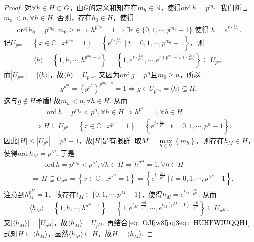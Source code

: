 \documentclass[../../main.tex]{subfiles}%
\begin{document}
\begin{proof}
对$\forall h\in H\subset G$，由$G$的定义和知存在$m_h\in\mathbb{N}$，使得$\mathrm{ord}\,h=p^{m_h}$. 我们断言$m_h<n,\forall h\in H$. 否则，存在$h_0\in H$，使得
\begin{align*}
\mathrm{ord}\,h_0=p^{m_0},m_0\geqslant n\Longrightarrow h^{p^{m_0}}=1\Longrightarrow \exists r\in \{0,1,\cdots,p^{m_0}-1\} \text{ 使得 } h=e^{r\cdot \frac{2\pi \mathrm{i}}{p^{m_0}}}.
\end{align*}
记$U_{p^{m_0}}=\left\{ x\in\mathbb{C} \mid x^{p^{m_0}}=1 \right\} =\left\{ e^{t\cdot \frac{2\pi \mathrm{i}}{p^{m_0}}}\mid t=0,1,\cdots,p^{m_0}-1 \right\}$，则
\begin{align*}
\langle h \rangle =\left\{ 1,h,\cdots,h^{p^{m_0}-1} \right\} =\left\{ 1,e^{r\cdot \frac{2\pi \mathrm{i}}{p^{m_0}}},\cdots,e^{r(p^{m_0}-1)\cdot \frac{2\pi \mathrm{i}}{p^{m_0}}} \right\} \subseteq U_{p^{m_0}}.
\end{align*}
而$| U_{p^{m_0}} |=| \langle h \rangle |$，故$\langle h \rangle =U_{p^{m_0}}$. 又因为$\mathrm{ord}\,g=p^n$且$m_0\geqslant n$，所以
\begin{align*}
g^{p^m}=(g^{p^n})^{p^{m_0-n}}=1\Longrightarrow g\in U_{p^{m_0}}=\langle h \rangle \subseteq H,
\end{align*}
这与$g\notin H$矛盾! 故$m_h<n,\forall h\in H$. 从而
\begin{align*}
&\quad\quad \mathrm{ord}\,h=p^{m_h}<p^n,\forall h\in H\Longrightarrow h^{p^n}=1,\forall h\in H
\\
&\Longrightarrow H\subseteq U_{p^n}=\left\{ x\in\mathbb{C} \mid x^{p^n}=1 \right\} =\left\{ e^{t\cdot \frac{2\pi \mathrm{i}}{p^n}}\mid t=0,1,\cdots,p^n-1 \right\}.
\end{align*}
因此$| H |\leqslant| U_{p^n} |=p^n-1$，故$| H |$是有限群. 取$M=\max\limits_{h\in H}\left\{ m_h \right\}$，则存在$h_M\in H$，使得$\mathrm{ord}\,h_M=p^M$. 于是
\begin{align}
&\quad\quad \mathrm{ord}\,h=p^{m_h}<p^M,\forall h\in H\Longrightarrow h^{p^M}=1,\forall h\in H \nonumber
\\
&\Longrightarrow H\subseteq U_{p^M}=\left\{ x\in\mathbb{C} \mid x^{p^M}=1 \right\} =\left\{ e^{t\cdot \frac{2\pi \mathrm{i}}{p^M}}\mid t=0,1,\cdots,p^M-1 \right\}.\label{eq:--OJfjw8fjioj3eq::--HUHFWIUQQH1}
\end{align}
注意到$h_{M}^{p^M}=1$，故存在$t_M\in \{0,1,\cdots,p^M-1\}$，使得$h_M=e^{t_M\cdot \frac{2\pi \mathrm{i}}{p^M}}$. 从而
\begin{align*}
\langle h_M \rangle =\left\{ 1,h,\cdots,h^{p^M-1} \right\} =\left\{ 1,e^{t_M\cdot \frac{2\pi \mathrm{i}}{p^M}},\cdots,e^{t_M(p^M-1)\cdot \frac{2\pi \mathrm{i}}{p^M}} \right\} \subseteq U_{p^M},
\end{align*}
又$| \langle h_M \rangle |=| U_{p^M} |$，故$\langle h_M \rangle =U_{p^M}$. 再结合$\eqref{eq:--OJfjw8fjioj3eq::--HUHFWIUQQH1}$式知$H\subseteq \langle h_M \rangle$，显然$\langle h_M \rangle \subseteq H$，故$H=\langle h_M \rangle$.

\end{proof}
\end{document}
